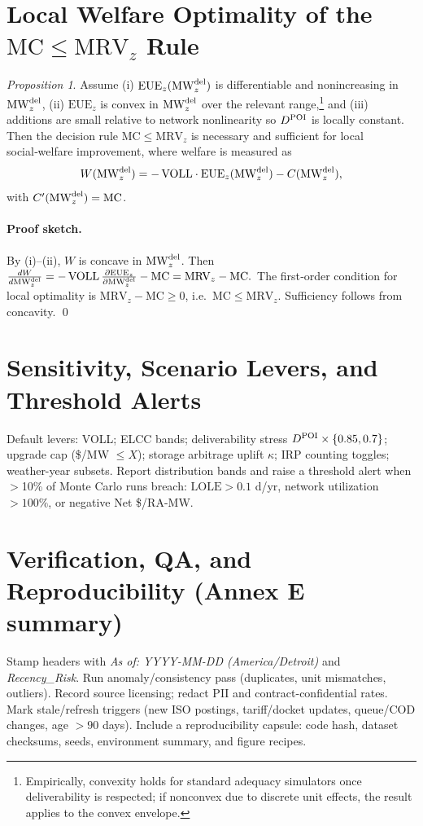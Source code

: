 \documentclass[11pt]{article}
\newcommand{\VOLL}{\ensuremath{\mathrm{VOLL}}}
\newcommand{\EUE}{\ensuremath{\mathrm{EUE}}}
\newcommand{\LOLE}{\ensuremath{\mathrm{LOLE}}}
\newcommand{\MRV}{\ensuremath{\mathrm{MRV}}}
\newcommand{\MC}{\ensuremath{\mathrm{MC}}}
\numberwithin{equation}{section}
\theoremstyle{definition}
\theoremstyle{remark}
\begin{document}
\section{Local Welfare Optimality of the \texorpdfstring{\(\MC\le\MRV_z\)}{MC<=MRV} Rule}
\label{sec:welfare-optimality}

\newtheorem{prop}{Proposition}
\begin{prop}
Assume (i) \(\EUE_z(\MWdel_z)\) is differentiable and nonincreasing in \(\MWdel_z\), 
(ii) \(\EUE_z\) is convex in \(\MWdel_z\) over the relevant range,\footnote{Empirically, convexity holds for standard adequacy simulators once deliverability is respected; if nonconvex due to discrete unit effects, the result applies to the convex envelope.}
and (iii) additions are small relative to network nonlinearity so \(\Ddel\) is locally constant.
Then the decision rule \(\MC \le \MRV_z\) is necessary and sufficient for local social‑welfare improvement, where welfare is measured as
\[
W(\MWdel_z)= -\,\VOLL\cdot \EUE_z(\MWdel_z) - C(\MWdel_z),
\]
with \(C'(\MWdel_z)=\MC\).
\end{prop}

\paragraph{Proof sketch.}
By (i)–(ii), \(W\) is concave in \(\MWdel_z\). Then
\(
\frac{dW}{d\MWdel_z}
= -\,\VOLL\,\frac{\partial \EUE_z}{\partial \MWdel_z} - \MC
= \MRV_z - \MC.
\)
The first‑order condition for local optimality is \(\MRV_z-\MC\ge 0\), i.e.\ \(\MC\le \MRV_z\). Sufficiency follows from concavity.
\qed

\section{Sensitivity, Scenario Levers, and Threshold Alerts}
Default levers: VOLL; ELCC bands; deliverability stress $\Ddel \times \{0.85,0.7\}$; upgrade cap (\$/MW $\le X$); storage arbitrage uplift $\kappa$; IRP counting toggles; weather-year subsets. Report distribution bands and raise a threshold alert when $>$10\% of Monte Carlo runs breach: $\LOLE>0.1$ d/yr, network utilization $>100\%$, or negative Net \$/RA-MW.

\section{Verification, QA, and Reproducibility (Annex E summary)}
Stamp headers with \emph{As of: YYYY-MM-DD (America/Detroit)} and \emph{Recency\_Risk}. Run anomaly/consistency pass (duplicates, unit mismatches, outliers). Record source licensing; redact PII and contract-confidential rates. Mark stale/refresh triggers (new ISO postings, tariff/docket updates, queue/COD changes, age $>90$ days). Include a reproducibility capsule: code hash, dataset checksums, seeds, environment summary, and figure recipes.
\end{document}
